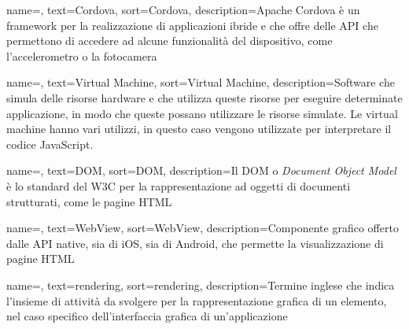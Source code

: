 
\renewcommand{\acronymname}{Acronimi e abbreviazioni}

    




\renewcommand{\glossaryname}{Glossario}

{
    name=,
    text=Cordova,
    sort=Cordova,
    description={Apache Cordova è un framework per la realizzazione di applicazioni ibride e che offre delle API che permettono di accedere ad alcune funzionalità del dispositivo, come l'accelerometro o la fotocamera}
}

{
    name=,
    text=Virtual Machine,
    sort=Virtual Machine,
    description={Software che simula delle risorse hardware e che utilizza queste risorse per eseguire determinate applicazione, in modo che queste possano utilizzare le risorse simulate. Le virtual machine hanno vari utilizzi, in questo caso vengono utilizzate per interpretare il codice JavaScript.}
}

{
    name=,
    text=DOM,
    sort=DOM,
    description={Il DOM o \textit{Document Object Model} è lo standard del W3C per la rappresentazione ad oggetti di documenti strutturati, come le pagine HTML}
}

{
    name=,
    text=WebView,
    sort=WebView,
    description={Componente grafico offerto dalle API native, sia di iOS, sia di Android, che permette la visualizzazione di pagine HTML}
}

{
    name=,
    text=rendering,
    sort=rendering,
    description={Termine inglese che indica l'insieme di attività da svolgere per la rappresentazione grafica di un elemento, nel caso specifico dell'interfaccia grafica di un'applicazione}
}

